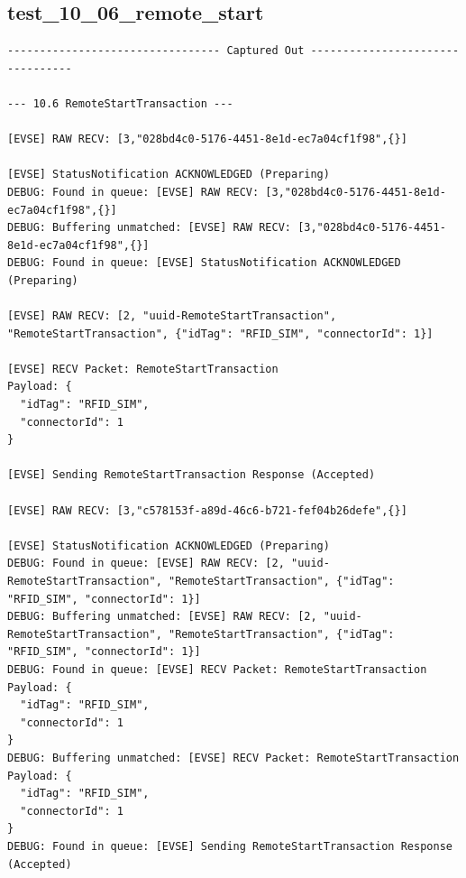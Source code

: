 \documentclass{article}
\begin{document}
\subsection*{test\_10\_06\_remote\_start}
\begin{lstlisting}
--------------------------------- Captured Out ---------------------------------

--- 10.6 RemoteStartTransaction ---

[EVSE] RAW RECV: [3,"028bd4c0-5176-4451-8e1d-ec7a04cf1f98",{}]

[EVSE] StatusNotification ACKNOWLEDGED (Preparing)
DEBUG: Found in queue: [EVSE] RAW RECV: [3,"028bd4c0-5176-4451-8e1d-ec7a04cf1f98",{}]
DEBUG: Buffering unmatched: [EVSE] RAW RECV: [3,"028bd4c0-5176-4451-8e1d-ec7a04cf1f98",{}]
DEBUG: Found in queue: [EVSE] StatusNotification ACKNOWLEDGED (Preparing)

[EVSE] RAW RECV: [2, "uuid-RemoteStartTransaction", "RemoteStartTransaction", {"idTag": "RFID_SIM", "connectorId": 1}]

[EVSE] RECV Packet: RemoteStartTransaction
Payload: {
  "idTag": "RFID_SIM",
  "connectorId": 1
}

[EVSE] Sending RemoteStartTransaction Response (Accepted)

[EVSE] RAW RECV: [3,"c578153f-a89d-46c6-b721-fef04b26defe",{}]

[EVSE] StatusNotification ACKNOWLEDGED (Preparing)
DEBUG: Found in queue: [EVSE] RAW RECV: [2, "uuid-RemoteStartTransaction", "RemoteStartTransaction", {"idTag": "RFID_SIM", "connectorId": 1}]
DEBUG: Buffering unmatched: [EVSE] RAW RECV: [2, "uuid-RemoteStartTransaction", "RemoteStartTransaction", {"idTag": "RFID_SIM", "connectorId": 1}]
DEBUG: Found in queue: [EVSE] RECV Packet: RemoteStartTransaction
Payload: {
  "idTag": "RFID_SIM",
  "connectorId": 1
}
DEBUG: Buffering unmatched: [EVSE] RECV Packet: RemoteStartTransaction
Payload: {
  "idTag": "RFID_SIM",
  "connectorId": 1
}
DEBUG: Found in queue: [EVSE] Sending RemoteStartTransaction Response (Accepted)
\end{lstlisting}
\end{document}
